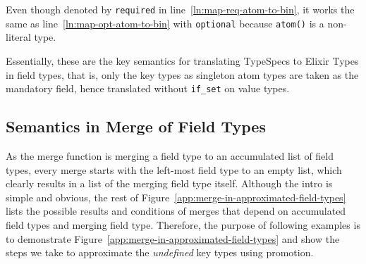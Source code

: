 Even though denoted by \texttt{required} in line~\ref{ln:map-req-atom-to-bin}, it works the same as line~\ref{ln:map-opt-atom-to-bin} with \texttt{optional} because \texttt{atom()} is a non-literal type.

Essentially, these are the key semantics for translating TypeSpecs to Elixir Types in field types, that is, only the key types as singleton atom types are taken as the mandatory field, hence translated without \texttt{if\_set} on value types.

\subsection*{Semantics in Merge of Field Types}

As the merge function is merging a field type to an accumulated list of field types, every merge starts with the left-most field type to an empty list, which clearly results in a list of the merging field type itself.
Although the intro is simple and obvious, the rest of Figure~\ref{app:merge-in-approximated-field-types} lists the possible results and conditions of merges that depend on accumulated field types and merging field type.
Therefore, the purpose of following examples is to demonstrate Figure~\ref{app:merge-in-approximated-field-types} and show the steps we take to approximate the \textit{undefined} key types using promotion.

